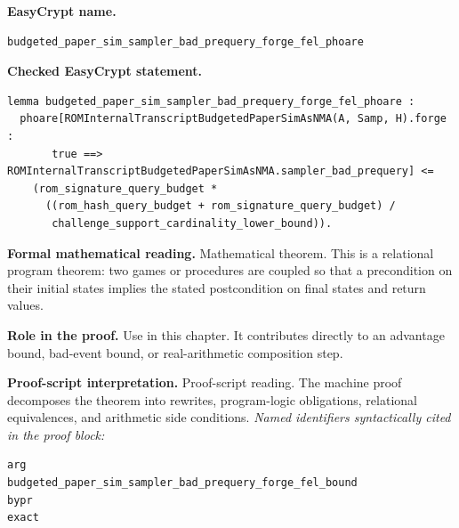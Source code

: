 \begin{formaltheorem}
\noindent\textbf{EasyCrypt name.}
\begin{lstlisting}[language=EasyCrypt,basicstyle=\ttfamily\scriptsize]
budgeted_paper_sim_sampler_bad_prequery_forge_fel_phoare
\end{lstlisting}
\noindent\textbf{Checked EasyCrypt statement.}
\begin{lstlisting}[language=EasyCrypt,basicstyle=\ttfamily\scriptsize]
lemma budgeted_paper_sim_sampler_bad_prequery_forge_fel_phoare :
  phoare[ROMInternalTranscriptBudgetedPaperSimAsNMA(A, Samp, H).forge :
       true ==> ROMInternalTranscriptBudgetedPaperSimAsNMA.sampler_bad_prequery] <=
    (rom_signature_query_budget *
      ((rom_hash_query_budget + rom_signature_query_budget) /
       challenge_support_cardinality_lower_bound)).
\end{lstlisting}
\noindent\textbf{Formal mathematical reading.}
Mathematical theorem. This is a relational program theorem: two games or procedures are coupled so that a precondition on their initial states implies the stated postcondition on final states and return values.

\noindent\textbf{Role in the proof.}
Use in this chapter. It contributes directly to an advantage bound, bad-event bound, or real-arithmetic composition step.

\noindent\textbf{Proof-script interpretation.}
Proof-script reading. The machine proof decomposes the theorem into rewrites, program-logic obligations, relational equivalences, and arithmetic side conditions.
\emph{Named identifiers syntactically cited in the proof block:}
\begin{lstlisting}[language=EasyCrypt,basicstyle=\ttfamily\scriptsize]
arg
budgeted_paper_sim_sampler_bad_prequery_forge_fel_bound
bypr
exact
\end{lstlisting}

\end{formaltheorem}


